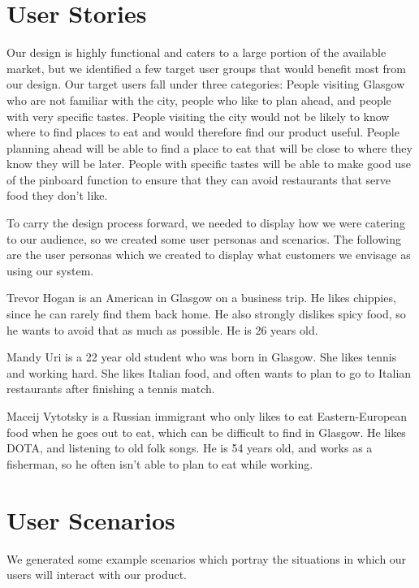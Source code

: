 \documentclass[10pt,a4paper]{article}
\begin{document}
\section*{User Stories}
Our design is highly functional and caters to a large portion of the available market, but we identified a few target user groups that would benefit most from our design. Our target users fall under three categories: People visiting Glasgow who are not familiar with the city, people who like to plan ahead, and people with very specific tastes. People visiting the city would not be likely to know where to find places to eat and would therefore find our product useful. People planning ahead will be able to find a place to eat that will be close to where they know they will be later. People with specific tastes will be able to make good use of the pinboard function to ensure that they can avoid restaurants that serve food they don’t like.

To carry the design process forward, we needed to display how we were catering to our audience, so we created some user personas and scenarios. The following are the user personas which we created to display what customers we envisage as using our system.

\begin{framed}
Trevor Hogan is an American in Glasgow on a business trip. He likes chippies, since he can rarely find them back home. He also strongly dislikes spicy food, so he wants to avoid that as much as possible. He is 26 years old.

Mandy Uri is a 22 year old student who was born in Glasgow. She likes tennis and working hard. She likes Italian food, and often wants to plan to go to Italian restaurants after finishing a tennis match.

Maceij Vytotsky is a Russian immigrant who only likes to eat Eastern-European food when he goes out to eat, which can be difficult to find in Glasgow. He likes DOTA, and listening to old folk songs. He is 54 years old, and works as a fisherman, so he often isn't able to plan to eat while working.
\end{framed}


\section*{User Scenarios}
We generated some example scenarios which portray the situations in which our users will interact with our product.
\end{document}
